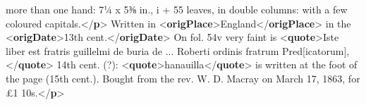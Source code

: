 \begin{shaded}
\hspace*{1em}\hspace*{1em}\hspace*{1em}\hspace*{1em} more than one hand: 7¼ x 5⅜ in., i + 55 leaves, in double columns:\mbox{}\newline 
\hspace*{1em}\hspace*{1em}\hspace*{1em}\hspace*{1em} with a few coloured capitals.{</\textbf{p}>}\mbox{}\newline 
{}\mbox{}\newline 
{}\mbox{}\newline 
\hspace*{1em}Written in {<\textbf{origPlace}>}England{</\textbf{origPlace}>} in the {<\textbf{origDate}>}13th\mbox{}\newline 
\hspace*{1em}\hspace*{1em}\hspace*{1em}\hspace*{1em}\hspace*{1em}\hspace*{1em} cent.{</\textbf{origDate}>} On fol. 54v very faint is {<\textbf{quote}>}Iste liber est fratris\mbox{}\newline 
\hspace*{1em}\hspace*{1em}\hspace*{1em}\hspace*{1em}\hspace*{1em}\hspace*{1em} guillelmi de buria de ... Roberti ordinis fratrum Pred[icatorum],{</\textbf{quote}>} 14th\mbox{}\newline 
\hspace*{1em}\hspace*{1em}\hspace*{1em}\hspace*{1em} cent. (?): {<\textbf{quote}>}hanauilla{</\textbf{quote}>} is written at the foot of the page (15th\mbox{}\newline 
\hspace*{1em}\hspace*{1em}\hspace*{1em}\hspace*{1em} cent.). Bought from the rev. W. D. Macray on March 17, 1863, for £1 10s.{</\textbf{p}>}\mbox{}\newline 

\end{shaded}
